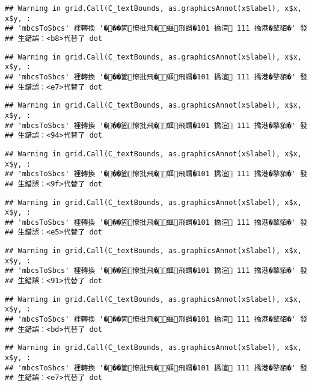 \documentclass[
]{article}
\begin{document}
\begin{verbatim}
## Warning in grid.Call(C_textBounds, as.graphicsAnnot(x$label), x$x, x$y, :
## 'mbcsToSbcs' 裡轉換 '���箇憭批飛�蝘飛蝟�101 撟渲 111 撟港�摮貊�' 發
## 生錯誤：<b8>代替了 dot
\end{verbatim}

\begin{verbatim}
## Warning in grid.Call(C_textBounds, as.graphicsAnnot(x$label), x$x, x$y, :
## 'mbcsToSbcs' 裡轉換 '���箇憭批飛�蝘飛蝟�101 撟渲 111 撟港�摮貊�' 發
## 生錯誤：<e7>代替了 dot
\end{verbatim}

\begin{verbatim}
## Warning in grid.Call(C_textBounds, as.graphicsAnnot(x$label), x$x, x$y, :
## 'mbcsToSbcs' 裡轉換 '���箇憭批飛�蝘飛蝟�101 撟渲 111 撟港�摮貊�' 發
## 生錯誤：<94>代替了 dot
\end{verbatim}

\begin{verbatim}
## Warning in grid.Call(C_textBounds, as.graphicsAnnot(x$label), x$x, x$y, :
## 'mbcsToSbcs' 裡轉換 '���箇憭批飛�蝘飛蝟�101 撟渲 111 撟港�摮貊�' 發
## 生錯誤：<9f>代替了 dot
\end{verbatim}

\begin{verbatim}
## Warning in grid.Call(C_textBounds, as.graphicsAnnot(x$label), x$x, x$y, :
## 'mbcsToSbcs' 裡轉換 '���箇憭批飛�蝘飛蝟�101 撟渲 111 撟港�摮貊�' 發
## 生錯誤：<e5>代替了 dot
\end{verbatim}

\begin{verbatim}
## Warning in grid.Call(C_textBounds, as.graphicsAnnot(x$label), x$x, x$y, :
## 'mbcsToSbcs' 裡轉換 '���箇憭批飛�蝘飛蝟�101 撟渲 111 撟港�摮貊�' 發
## 生錯誤：<91>代替了 dot
\end{verbatim}

\begin{verbatim}
## Warning in grid.Call(C_textBounds, as.graphicsAnnot(x$label), x$x, x$y, :
## 'mbcsToSbcs' 裡轉換 '���箇憭批飛�蝘飛蝟�101 撟渲 111 撟港�摮貊�' 發
## 生錯誤：<bd>代替了 dot
\end{verbatim}

\begin{verbatim}
## Warning in grid.Call(C_textBounds, as.graphicsAnnot(x$label), x$x, x$y, :
## 'mbcsToSbcs' 裡轉換 '���箇憭批飛�蝘飛蝟�101 撟渲 111 撟港�摮貊�' 發
## 生錯誤：<e7>代替了 dot
\end{verbatim}
\end{document}
